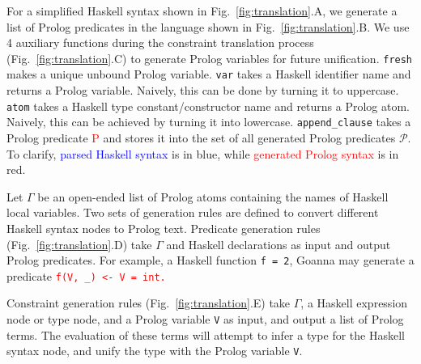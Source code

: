 \documentclass[pdflatex,lineno,sn-nature,Numbered]{sn-jnl}%
\begin{document}
For a simplified Haskell syntax shown in Fig.~\ref{fig:translation}.A, we generate a list of Prolog predicates in the language shown in Fig.~\ref{fig:translation}.B. We use 4 auxiliary functions during the constraint translation process (Fig.~\ref{fig:translation}.C) to generate Prolog variables for future unification. \texttt{fresh} makes a unique unbound Prolog variable. \texttt{var} takes a Haskell identifier name and returns a Prolog variable. Naively, this can be done by turning it to uppercase. \texttt{atom} takes a Haskell type constant/constructor name and returns a Prolog atom. Naively, this can be achieved by turning it into lowercase. \texttt{append\_clause} takes a Prolog predicate \textcolor{red}{P} and stores it into the set of all generated Prolog predicates $\mathcal{P}$. To clarify,  \textcolor{blue}{parsed Haskell syntax} is in blue, while \textcolor{red}{generated Prolog syntax} is in red. 
    
    Let $\Gamma$ be an open-ended list of Prolog atoms containing the names of Haskell local variables. Two sets of generation rules are defined to convert different Haskell syntax nodes to Prolog text. Predicate generation rules (Fig.~\ref{fig:translation}.D) take $\Gamma$ and Haskell declarations as input and output Prolog predicates. For example, a Haskell function \texttt{f = 2}, Goanna may generate a predicate \texttt{\textcolor{red}{f(V, \_) <- V = int.}}
    
    Constraint generation rules (Fig.~\ref{fig:translation}.E) take $\Gamma$, a Haskell expression node or type node, and a Prolog variable \texttt{V} as input, and output a list of Prolog terms. The evaluation of these terms will attempt to infer a type for the Haskell syntax node, and unify the type with the Prolog variable \texttt{V}.
    
\end{document}
